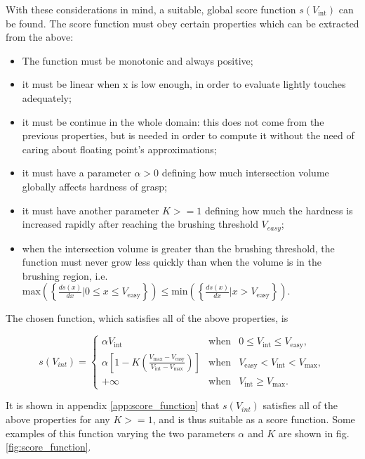 With these considerations in mind, a suitable, global score function $s(V_{\text{int}})$
can be found. The score function must obey certain properties which can be
extracted from the above:

\begin{itemize}
  \item{The function must be monotonic and always positive;}
  \item{it must be linear when x is low enough, in order to evaluate
    lightly touches adequately;}
  \item{it must be continue in the whole domain: this does not come
      from the previous properties, but is needed in order to compute it without
    the need of caring about floating point's approximations;}
  \item{it must have a parameter $\alpha>0$ defining how much
    intersection volume globally affects hardness of grasp;}
  \item{it must have another parameter $K>=1$ defining how much the hardness is
    increased rapidly after reaching the brushing threshold $V_{easy}$;}
  \item{when the intersection volume is greater than the brushing threshold, the
      function
    must never grow less quickly than when the volume is in the brushing
    region, i.e. $\text{max}\left( \left\{ \frac{ds(x)}{dx} | 0 \leq
    x \leq V_{\text{easy}} \right\} \right) \leq \text{min}\left( \left\{
  \frac{ds(x)}{dx} | x > V_{\text{easy}}\right\} \right)$.}
\end{itemize}

The chosen function, which satisfies all of the above properties, is

\begin{equation}
  s(V_{int})=\left\{
    \begin{array}{lcr}
      \alpha V_{\text{int}} & \text{when} & 0 \leq V_{\text{int}} \leq V_{\text{easy}}, \\
      \alpha
      \left[1-K\left(\frac{V_{\text{max}}-V_{\text{easy}}}{V_{\text{int}}-V_{\text{max}}}\right)\right]
      & \text{when} &  V_{\text{easy}} < V_{\text{int}} < V_{\text{max}}, \\
      +\infty & \text{when} & V_{\text{int}} \geq V_{\text{max}}.
    \end{array}
  \right.
\end{equation}

It is shown in appendix \ref{app:score_function} that $s(V_{int})$ satisfies all
of the above properties for any $K>=1$, and is thus suitable as a score
function. Some examples of this function varying the two parameters $\alpha$ and
$K$ are shown in fig. \ref{fig:score_function}.

